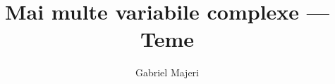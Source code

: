 \documentclass[a4paper, 12pt]{article}
\theoremstyle{definition}
\begin{document}
\title{Mai multe variabile complexe --- Teme}
\author{Gabriel Majeri}
\date{}

\maketitle




\end{document}
